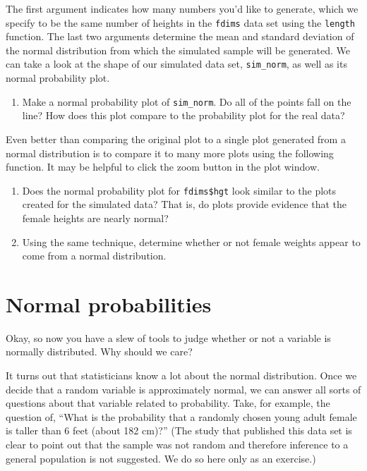 \documentclass[]{book}
\newenvironment{Shaded}{\begin{snugshade}}{\end{snugshade}}
\newcommand{\KeywordTok}[1]{\textcolor[rgb]{0.13,0.29,0.53}{\textbf{{#1}}}}
\newcommand{\NormalTok}[1]{{#1}}
\providecommand{\tightlist}{%
  \setlength{\itemsep}{0pt}\setlength{\parskip}{0pt}}
\theoremstyle{definition}
\theoremstyle{definition}
\theoremstyle{remark}
\begin{document}
The first argument indicates how many numbers you'd like to generate,
which we specify to be the same number of heights in the \texttt{fdims}
data set using the \texttt{length} function. The last two arguments
determine the mean and standard deviation of the normal distribution
from which the simulated sample will be generated. We can take a look at
the shape of our simulated data set, \texttt{sim\_norm}, as well as its
normal probability plot.

\begin{enumerate}
\def\labelenumi{\arabic{enumi}.}
\setcounter{enumi}{2}
\tightlist
\item
  Make a normal probability plot of \texttt{sim\_norm}. Do all of the
  points fall on the line? How does this plot compare to the probability
  plot for the real data?
\end{enumerate}

Even better than comparing the original plot to a single plot generated
from a normal distribution is to compare it to many more plots using the
following function. It may be helpful to click the zoom button in the
plot window.

\begin{Shaded}
\end{Shaded}

\begin{enumerate}
\def\labelenumi{\arabic{enumi}.}
\setcounter{enumi}{3}
\item
  Does the normal probability plot for \texttt{fdims\$hgt} look similar
  to the plots created for the simulated data? That is, do plots provide
  evidence that the female heights are nearly normal?
\item
  Using the same technique, determine whether or not female weights
  appear to come from a normal distribution.
\end{enumerate}

\section*{Normal probabilities}\label{normal-probabilities}

Okay, so now you have a slew of tools to judge whether or not a variable
is normally distributed. Why should we care?

It turns out that statisticians know a lot about the normal
distribution. Once we decide that a random variable is approximately
normal, we can answer all sorts of questions about that variable related
to probability. Take, for example, the question of, ``What is the
probability that a randomly chosen young adult female is taller than 6
feet (about 182 cm)?'' (The study that published this data set is clear
to point out that the sample was not random and therefore inference to a
general population is not suggested. We do so here only as an exercise.)
\end{document}
